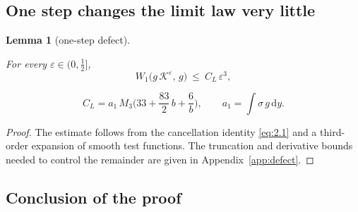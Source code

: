 \documentclass[aip,jmp,preprint,onecolumn,floatfix,superscriptaddress,nofootinbib,11pt]{revtex4-2}
\theoremstyle{plain}
\newtheorem{lemma}{Lemma}
\theoremstyle{remark}
\numberwithin{equation}{section}
\newcommand{\dd}{\mathrm{d}}
\newcommand{\eps}{\varepsilon}
\begin{document}
\subsection{One step changes the limit law very little}\label{sec:4_5}
 
\begin{lemma}[one-step defect]\label{lem:6}
 
For every $\eps\in(0,\tfrac12]$,
%
\begin{equation}
W_1\big(g\,\mathcal K^{\eps},\,g\big)\ \le\ C_L\,\eps^{3},
\label{eq:4.6}
\end{equation}
 
\begin{equation}
C_L=a_1\,M_3\Big(33+\frac{83}{2}\,b+\frac6b\Big),\qquad a_1=\int\sigma\,g\,\dd y .
\label{eq:4.7}
\end{equation}
 
\end{lemma}
 
\begin{proof}
The estimate follows from the cancellation identity \eqref{eq:2.1} and a third-order expansion of smooth test functions. The truncation and derivative bounds needed to control the remainder are given in Appendix~\ref{app:defect}.
\end{proof}
 
\subsection{Conclusion of the proof}\label{sec:4_6}
 
\end{document}
